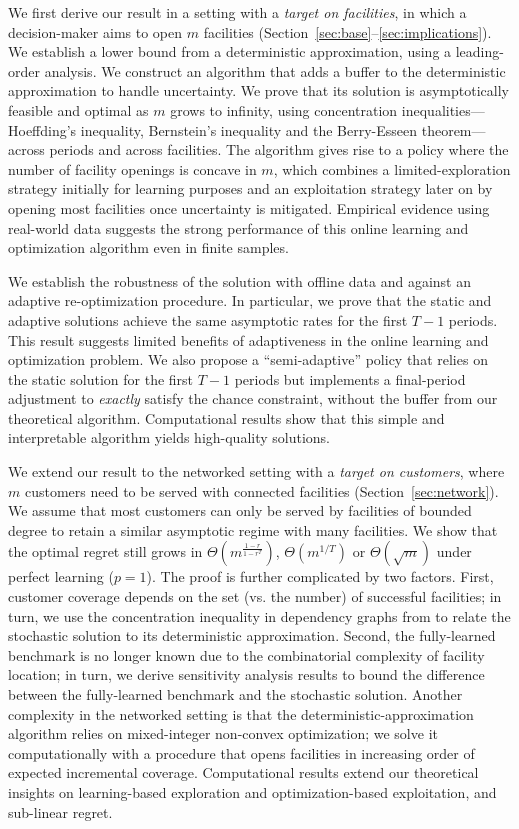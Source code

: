 \documentclass[blindrev]{informs3noheader}
\begin{document}
We first derive our result in a setting with a \textit{target on facilities}, in which a decision-maker aims to open $m$ facilities (Section~\ref{sec:base}--\ref{sec:implications}). We establish a lower bound from a deterministic approximation, using a leading-order analysis. We construct an algorithm that adds a buffer to the deterministic approximation to handle uncertainty. We prove that its solution is asymptotically feasible and optimal as $m$ grows to infinity, using concentration inequalities---Hoeffding's inequality, Bernstein's inequality and the Berry-Esseen theorem---across periods and across facilities. The algorithm gives rise to a policy where the number of facility openings is concave in $m$, which combines a limited-exploration strategy initially for learning purposes and an exploitation strategy later on by opening most facilities once uncertainty is mitigated. Empirical evidence using real-world data suggests the strong performance of this online learning and optimization algorithm even in finite samples.

We establish the robustness of the solution with offline data and against an adaptive re-optimization procedure. In particular, we prove that the static and adaptive solutions achieve the same asymptotic rates for the first $T-1$ periods. This result suggests limited benefits of adaptiveness in the online learning and optimization problem. We also propose a ``semi-adaptive'' policy that relies on the static solution for the first $T-1$ periods but implements a final-period adjustment to \textit{exactly} satisfy the chance constraint, without the buffer from our theoretical algorithm. Computational results show that this simple and interpretable algorithm yields high-quality solutions.

We extend our result to the networked setting with a \textit{target on customers}, where $m$ customers need to be served with connected facilities (Section~\ref{sec:network}). We assume that most customers can only be served by facilities of bounded degree to retain a similar asymptotic regime with many facilities. We show that the optimal regret still grows in $\Theta\left(m^{\frac{1-r}{1-r^T}}\right)$, $\Theta(m^{1/T})$ or $\Theta(\sqrt m)$ under perfect learning ($p=1$). The proof is further complicated by two factors. First, customer coverage depends on the set (vs. the number) of successful facilities; in turn, we use the concentration inequality in dependency graphs from \cite{janisch2024berry} to relate the stochastic solution to its deterministic approximation. Second, the fully-learned benchmark is no longer known due to the combinatorial complexity of facility location; in turn, we derive sensitivity analysis results to bound the difference between the fully-learned benchmark and the stochastic solution. Another complexity in the networked setting is that the deterministic-approximation algorithm relies on mixed-integer non-convex optimization; we solve it computationally with a procedure that opens facilities in increasing order of expected incremental coverage. Computational results extend our theoretical insights on learning-based exploration and optimization-based exploitation, and sub-linear regret.
\end{document}
